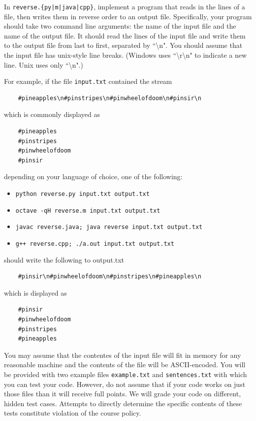 \documentclass[12pt]{article}
\begin{document}
In \texttt{reverse.\{py|m|java|cpp\}}, implement a program that reads in the lines of a file, then writes them in reverse order to an output file. Specifically, your program should take two command line arguments: the name of the input file and the name of the output file. It should read the lines of the input file and write them to the output file from last to first, separated by ``\textbackslash n". You should assume that the input file has unix-style line breaks. (Windows uses ``\textbackslash r\textbackslash n" to indicate a new line. Unix uses only ``\textbackslash n".)

For example, if the file \texttt{input.txt} contained the stream

\begin{verbatim}
    #pineapples\n#pinstripes\n#pinwheelofdoom\n#pinsir\n
\end{verbatim}

which is commonly displayed as
\begin{verbatim}
    #pineapples
    #pinstripes
    #pinwheelofdoom
    #pinsir
\end{verbatim}

depending on your language of choice, one of the following:

\begin{itemize}
    \item \texttt{python reverse.py input.txt output.txt}
    \item \texttt{octave -qH reverse.m input.txt output.txt}
    \item \texttt{javac reverse.java; java reverse input.txt output.txt}
    \item \texttt{g++ reverse.cpp; ./a.out input.txt output.txt}
\end{itemize}

should write the following to output.txt

\begin{verbatim}
    #pinsir\n#pinwheelofdoom\n#pinstripes\n#pineapples\n
\end{verbatim}

which is displayed as

\begin{verbatim}
    #pinsir
    #pinwheelofdoom
    #pinstripes
    #pineapples
\end{verbatim}

You may assume that the contentes of the input file will fit in memory for any reasonable machine and the contents of the file will be ASCII-encoded. You will be provided with two example files \texttt{example.txt} and \texttt{sentences.txt} with which you can test your code. However, do not assume that if your code works on just those files than it will receive full points. We will grade your code on different, hidden test cases. Attempts to directly determine the specific contents of these tests constitute violation of the course policy.
\end{document}

